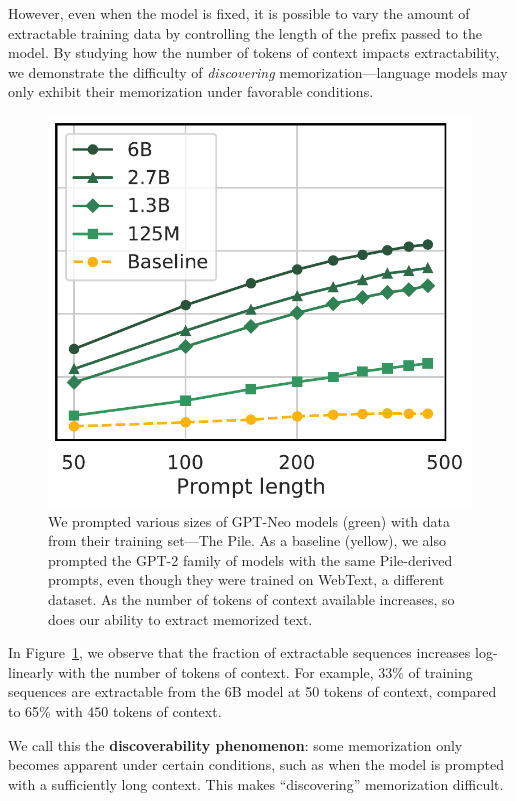 However, even when the model is fixed, it is possible to vary the amount of extractable training data by controlling the length of the prefix passed to the model. 
By studying how the number of tokens of context impacts extractability, we demonstrate the difficulty of \emph{discovering} memorization---language models may only exhibit their memorization under favorable conditions.


\begin{figure}[h]
        \centering
        \includegraphics[height=0.4\textwidth]{figures/exactly_mem-vs-prompt_len-seq-500-gen-50-xlabel-markers.pdf} %
        \caption{
        We prompted various sizes of GPT-Neo models (green) with data from their training set---The Pile. 
    As a baseline (yellow), we also prompted the GPT-2 family of models with the same Pile-derived prompts, even though they were trained on WebText, a different dataset.
    As the number of tokens of context available increases, so does our ability to extract memorized text.
    }
        \label{fig:main-res-context}
\end{figure}

In Figure~\ref{fig:main-res-context}, we observe that the fraction of extractable sequences increases log-linearly with the number of tokens of context. For example, 33\% of training sequences are extractable from the 6B model at 50 tokens of context, compared to 65\% with $450$ tokens of context.

We call this the \textbf{discoverability phenomenon}:
some memorization only becomes apparent under certain conditions, such as when the model is prompted with a sufficiently long context.
This makes ``discovering'' memorization difficult.

%

